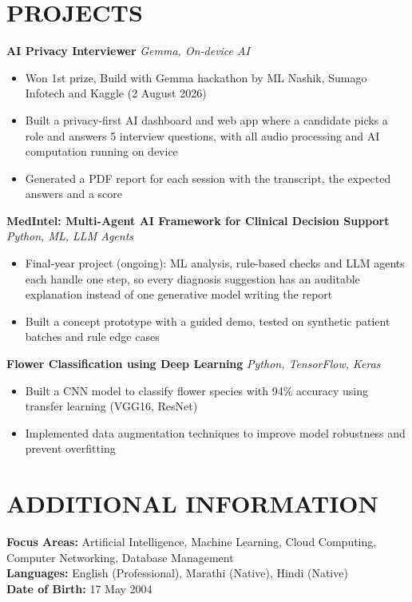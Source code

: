 \documentclass[11pt,a4paper]{article}
\begin{document}
\vspace{1pt}

\section*{PROJECTS}

\textbf{AI Privacy Interviewer} \hfill \textit{Gemma, On-device AI}
\begin{itemize}[leftmargin=15pt, itemsep=0pt, parsep=0pt, topsep=1pt]
    \item Won 1st prize, Build with Gemma hackathon by ML Nashik, Sumago Infotech and Kaggle (2 August 2026)
    \item Built a privacy-first AI dashboard and web app where a candidate picks a role and answers 5 interview questions, with all audio processing and AI computation running on device
    \item Generated a PDF report for each session with the transcript, the expected answers and a score
\end{itemize}

\vspace{0.5pt}

\textbf{MedIntel: Multi-Agent AI Framework for Clinical Decision Support} \hfill \textit{Python, ML, LLM Agents}
\begin{itemize}[leftmargin=15pt, itemsep=0pt, parsep=0pt, topsep=1pt]
    \item Final-year project (ongoing): ML analysis, rule-based checks and LLM agents each handle one step, so every diagnosis suggestion has an auditable explanation instead of one generative model writing the report
    \item Built a concept prototype with a guided demo, tested on synthetic patient batches and rule edge cases
\end{itemize}

\vspace{0.5pt}

\textbf{Flower Classification using Deep Learning} \hfill \textit{Python, TensorFlow, Keras}
\begin{itemize}[leftmargin=15pt, itemsep=0pt, parsep=0pt, topsep=1pt]
    \item Built a CNN model to classify flower species with 94\% accuracy using transfer learning (VGG16, ResNet)
    \item Implemented data augmentation techniques to improve model robustness and prevent overfitting
\end{itemize}

\vspace{1pt}

\section*{ADDITIONAL INFORMATION}

\textbf{Focus Areas:} Artificial Intelligence, Machine Learning, Cloud Computing, Computer Networking, Database Management\\
\textbf{Languages:} English (Professional), Marathi (Native), Hindi (Native)\\
\textbf{Date of Birth:} 17 May 2004
\end{document}
